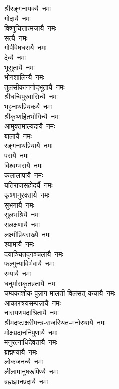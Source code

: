 \begin{multicols}{2}
\begin{flushleft}
श्रीरङ्गनायक्यै~नमः\\
गोदायै~नमः\\
विष्णुचित्तात्मजायै~नमः\\
सत्यै~नमः\\
गोपीवेषधरायै~नमः\\
देव्यै~नमः\\
भूसुतायै~नमः\\
भोगशालिन्यै~नमः\\
तुलसीकाननोद्भूतायै~नमः\\
श्रीधन्विपुरवासिन्यै~नमः\hfill{}\\
भट्टनाथप्रियकर्यै~नमः\\
श्रीकृष्णहितभोगिन्यै~नमः\\
आमुक्तमाल्यदायै~नमः\\
बालायै~नमः\\
रङ्गनाथप्रियायै~नमः\\
परायै~नमः\\
विश्वम्भरायै~नमः\\
कलालापायै~नमः\\
यतिराजसहोदर्यै~नमः\\
कृष्णानुरक्तायै~नमः\hfill{}\\
सुभगायै~नमः\\
सुलभश्रियै~नमः\\
सलक्षणायै~नमः\\
लक्ष्मीप्रियसख्यै~नमः\\
श्यामायै~नमः\\
दयाञ्चितदृगञ्चलायै~नमः\\
फल्गुन्याविर्भवायै~नमः\\
रम्यायै~नमः\\
धनुर्मासकृतव्रतायै~नमः\\
चम्पकाशोक-पुन्नाग-मालती-विलसत्-कचायै~नमः\hfill{}\\
आकारत्रयसम्पन्नायै~नमः\\
नारायणपदाश्रितायै~नमः\\
श्रीमदष्टाक्षरीमन्त्र-राजस्थित-मनोरथायै~नमः\\
मोक्षप्रदाननिपुणायै~नमः\\
मनुरत्नाधिदेवतायै~नमः\\
ब्रह्मण्यायै~नमः\\
लोकजनन्यै~नमः\\
लीलामानुषरूपिण्यै~नमः\\
ब्रह्मज्ञानप्रदायै~नमः\\

\end{flushleft}
\end{multicols}
